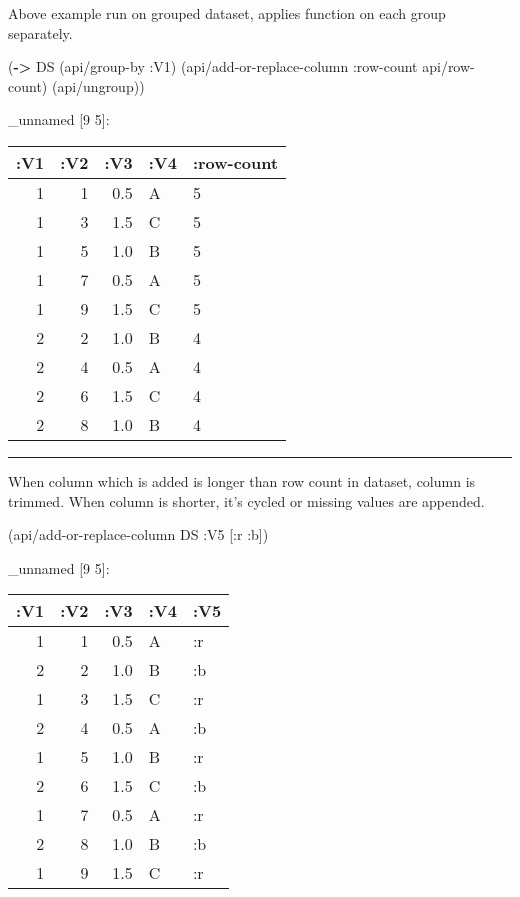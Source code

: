 \documentclass[]{article}
\newenvironment{Shaded}{\begin{snugshade}}{\end{snugshade}}
\newcommand{\KeywordTok}[1]{\textcolor[rgb]{0.13,0.29,0.53}{\textbf{#1}}}
\newcommand{\AttributeTok}[1]{\textcolor[rgb]{0.77,0.63,0.00}{#1}}
\newcommand{\NormalTok}[1]{#1}
\begin{document}
Above example run on grouped dataset, applies function on each group
separately.

\begin{Shaded}
\begin{Highlighting}[]
\NormalTok{(}\KeywordTok{->}\NormalTok{ DS}
\NormalTok{    (api/group-by }\AttributeTok{:V1}\NormalTok{)}
\NormalTok{    (api/add-or-replace-column }\AttributeTok{:row-count}\NormalTok{ api/row-count)}
\NormalTok{    (api/ungroup))}
\end{Highlighting}
\end{Shaded}

\_unnamed {[}9 5{]}:

\begin{longtable}[]{@{}rrrll@{}}
\toprule
:V1 & :V2 & :V3 & :V4 & :row-count\tabularnewline
\midrule
\endhead
1 & 1 & 0.5 & A & 5\tabularnewline
1 & 3 & 1.5 & C & 5\tabularnewline
1 & 5 & 1.0 & B & 5\tabularnewline
1 & 7 & 0.5 & A & 5\tabularnewline
1 & 9 & 1.5 & C & 5\tabularnewline
2 & 2 & 1.0 & B & 4\tabularnewline
2 & 4 & 0.5 & A & 4\tabularnewline
2 & 6 & 1.5 & C & 4\tabularnewline
2 & 8 & 1.0 & B & 4\tabularnewline
\bottomrule
\end{longtable}

\begin{center}\rule{0.5\linewidth}{0.5pt}\end{center}

When column which is added is longer than row count in dataset, column
is trimmed. When column is shorter, it's cycled or missing values are
appended.

\begin{Shaded}
\begin{Highlighting}[]
\NormalTok{(api/add-or-replace-column DS }\AttributeTok{:V5}\NormalTok{ [}\AttributeTok{:r} \AttributeTok{:b}\NormalTok{])}
\end{Highlighting}
\end{Shaded}

\_unnamed {[}9 5{]}:

\begin{longtable}[]{@{}rrrll@{}}
\toprule
:V1 & :V2 & :V3 & :V4 & :V5\tabularnewline
\midrule
\endhead
1 & 1 & 0.5 & A & :r\tabularnewline
2 & 2 & 1.0 & B & :b\tabularnewline
1 & 3 & 1.5 & C & :r\tabularnewline
2 & 4 & 0.5 & A & :b\tabularnewline
1 & 5 & 1.0 & B & :r\tabularnewline
2 & 6 & 1.5 & C & :b\tabularnewline
1 & 7 & 0.5 & A & :r\tabularnewline
2 & 8 & 1.0 & B & :b\tabularnewline
1 & 9 & 1.5 & C & :r\tabularnewline
\bottomrule
\end{longtable}
\end{document}
